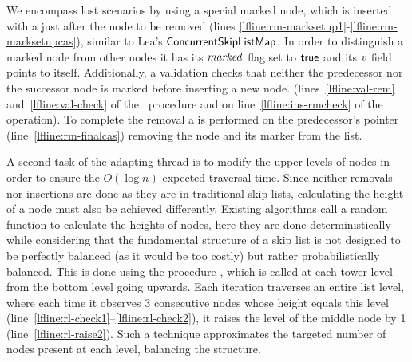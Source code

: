 We encompass lost  scenarios by using a special marked node, which is inserted with 
a \CAS{} just after the node to be removed (lines \ref{lfline:rm-marksetup1}-\ref{lfline:rm-marksetupcas}), 
similar to Lea's $\lit{ConcurrentSkipListMap}$.
In order to distinguish a marked node from other nodes it has its $\ms{marked}$ flag set to $\lit{true}$ 
and its $\ms{v}$ field points to itself.
Additionally, a validation checks that neither the predecessor nor the successor node is marked 
before inserting a new node.
(lines~\ref{lfline:val-rem} and~\ref{lfline:val-check} of the~ procedure and on
line~\ref{lfline:ins-rmcheck} of the  operation).
To complete the removal
a \CAS{} is performed on the predecessor's  pointer 
(line~\ref{lfline:rm-finalcas}) removing the node and its marker from the list.

A second task of the adapting thread is to
modify the upper levels of nodes in order to ensure
the $O(\log{n})$ expected traversal time.
Since neither removals nor insertions are done as they are in traditional skip lists,
calculating the height of a node must also be achieved differently.
Existing algorithms call a random function to calculate the heights of nodes,
here they are done deterministically while
considering that
the fundamental structure of a skip list is not designed
to be perfectly balanced (as it would be too costly) but rather probabilistically balanced.
This is done using the procedure ,
which is called at each tower level from the bottom level going upwards.
Each iteration traverses an entire list level, 
where each time it observes 3 consecutive nodes whose height equals this level (line~\ref{lfline:rl-check1}--\ref{lfline:rl-check2}),
it raises the level of the middle node by 1 (line~\ref{lfline:rl-raise2}).
Such a technique approximates the targeted number of nodes present at each level, 
balancing the structure.

